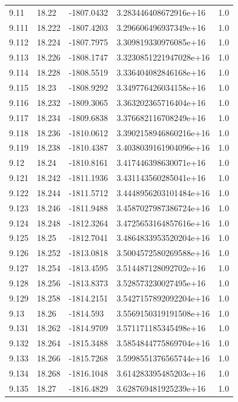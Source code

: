 \begin{tabular}{lllll}
9.11 & 18.22 & -1807.0432 & 3.283446408672916e+16 & 1.0 \\
9.111 & 18.222 & -1807.4203 & 3.296606496937349e+16 & 1.0 \\
9.112 & 18.224 & -1807.7975 & 3.309819330976085e+16 & 1.0 \\
9.113 & 18.226 & -1808.1747 & 3.3230851221947028e+16 & 1.0 \\
9.114 & 18.228 & -1808.5519 & 3.336404082846168e+16 & 1.0 \\
9.115 & 18.23 & -1808.9292 & 3.349776426034158e+16 & 1.0 \\
9.116 & 18.232 & -1809.3065 & 3.363202365716404e+16 & 1.0 \\
9.117 & 18.234 & -1809.6838 & 3.376682116708249e+16 & 1.0 \\
9.118 & 18.236 & -1810.0612 & 3.3902158946860216e+16 & 1.0 \\
9.119 & 18.238 & -1810.4387 & 3.4038039161904096e+16 & 1.0 \\
9.12 & 18.24 & -1810.8161 & 3.417446398630071e+16 & 1.0 \\
9.121 & 18.242 & -1811.1936 & 3.431143560285041e+16 & 1.0 \\
9.122 & 18.244 & -1811.5712 & 3.4448956203101484e+16 & 1.0 \\
9.123 & 18.246 & -1811.9488 & 3.4587027987386724e+16 & 1.0 \\
9.124 & 18.248 & -1812.3264 & 3.4725653164857616e+16 & 1.0 \\
9.125 & 18.25 & -1812.7041 & 3.4864833953520204e+16 & 1.0 \\
9.126 & 18.252 & -1813.0818 & 3.5004572580269588e+16 & 1.0 \\
9.127 & 18.254 & -1813.4595 & 3.514487128092702e+16 & 1.0 \\
9.128 & 18.256 & -1813.8373 & 3.528573230027495e+16 & 1.0 \\
9.129 & 18.258 & -1814.2151 & 3.5427157892092204e+16 & 1.0 \\
9.13 & 18.26 & -1814.593 & 3.5569150319191508e+16 & 1.0 \\
9.131 & 18.262 & -1814.9709 & 3.571171185345498e+16 & 1.0 \\
9.132 & 18.264 & -1815.3488 & 3.5854844775869704e+16 & 1.0 \\
9.133 & 18.266 & -1815.7268 & 3.5998551376565744e+16 & 1.0 \\
9.134 & 18.268 & -1816.1048 & 3.614283395485203e+16 & 1.0 \\
9.135 & 18.27 & -1816.4829 & 3.628769481925239e+16 & 1.0 \\

\end{tabular}

